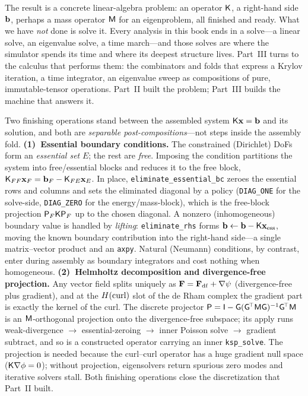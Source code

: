 The result is a concrete linear-algebra problem: an operator $\mathsf{K}$, a
right-hand side $\mathbf{b}$, perhaps a mass operator $\mathsf{M}$ for an eigenproblem, all
finished and ready. What we have \emph{not} done is solve it. Every analysis in
this book ends in a solve---a linear solve, an eigenvalue solve, a time march---and
those solves are where the simulator spends its time and where its deepest
structure lives. Part~III turns to the calculus that performs them: the
combinators and folds that express a Krylov iteration, a time integrator, an
eigenvalue sweep as compositions of pure, immutable-tensor operations. Part~II
built the problem; Part~III builds the machine that answers it.

\summarysection
Two finishing operations stand between the assembled system $\mathsf{K}\mathbf{x}=\mathbf{b}$ and
its solution, and both are \emph{separable post-compositions}---not steps inside
the assembly fold. \textbf{(1)~Essential boundary conditions.} The constrained
(Dirichlet) DoFs form an \emph{essential set} $E$; the rest are \emph{free}.
Imposing the condition partitions the system into free/essential blocks and
reduces it to the free block, $\mathsf{K}_{FF}\mathbf{x}_F=\mathbf{b}_F-\mathsf{K}_{FE}\mathbf{x}_E$. In
place, \texttt{eliminate\_essential\_bc} zeroes the essential rows and columns and
sets the eliminated diagonal by a policy (\texttt{DIAG\_ONE} for the solve-side,
\texttt{DIAG\_ZERO} for the energy/mass-block), which is the free-block projection
$\mathsf{P}_F\mathsf{K}\mathsf{P}_F$ up to the chosen diagonal. A nonzero (inhomogeneous)
boundary value is handled by \emph{lifting}: \texttt{eliminate\_rhs} forms
$\mathbf{b}\leftarrow\mathbf{b}-\mathsf{K}\mathbf{x}_{\mathrm{ess}}$, moving the known boundary
contribution into the right-hand side---a single matrix--vector product and an
\texttt{axpy}. Natural (Neumann) conditions, by contrast, enter during assembly as
boundary integrators and cost nothing when homogeneous. \textbf{(2)~Helmholtz
decomposition and divergence-free projection.} Any vector field splits uniquely as
$\mathbf{F}=\mathbf{F}_{\mathrm{df}}+\nabla\psi$ (divergence-free plus gradient), and at the
$H(\mathrm{curl})$ slot of the de Rham complex the gradient part is exactly the kernel of
the curl. The discrete projector
$\mathsf{P}=\mathsf{I}-\mathsf{G}(\mathsf{G}^{\!\top}\mathsf{M}\mathsf{G})^{-1}\mathsf{G}^{\!\top}\mathsf{M}$
is an $\mathsf{M}$-orthogonal projection onto the divergence-free subspace; its apply
runs weak-divergence $\to$ essential-zeroing $\to$ inner Poisson solve $\to$
gradient subtract, and so is a constructed operator carrying an inner
\texttt{ksp\_solve}. The projection is needed because the curl--curl operator has
a huge gradient null space ($\mathsf{K}\nabla\phi=0$); without projection,
eigensolvers return spurious zero modes and iterative solvers stall. Both finishing
operations close the discretization that Part~II built.

